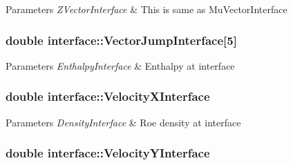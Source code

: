 \begin{DoxyParams}{Parameters}
{\em Z\+Vector\+Interface} & This is same as Mu\+Vector\+Interface \\
\hline
\end{DoxyParams}
\subsubsection[{\texorpdfstring{Vector\+Jump\+Interface}{VectorJumpInterface}}]{\setlength{\rightskip}{0pt plus 5cm}double interface\+::\+Vector\+Jump\+Interface\mbox{[}5\mbox{]}}\hypertarget{classinterface_aa99760e0d73f30c6f1541414efc76f87}{}\label{classinterface_aa99760e0d73f30c6f1541414efc76f87}

\begin{DoxyParams}{Parameters}
{\em Enthalpy\+Interface} & Enthalpy at interface \\
\hline
\end{DoxyParams}
\subsubsection[{\texorpdfstring{Velocity\+X\+Interface}{VelocityXInterface}}]{\setlength{\rightskip}{0pt plus 5cm}double interface\+::\+Velocity\+X\+Interface}\hypertarget{classinterface_afae6ebb7814474f2264759a14521f448}{}\label{classinterface_afae6ebb7814474f2264759a14521f448}

\begin{DoxyParams}{Parameters}
{\em Density\+Interface} & Roe density at interface \\
\hline
\end{DoxyParams}
\subsubsection[{\texorpdfstring{Velocity\+Y\+Interface}{VelocityYInterface}}]{\setlength{\rightskip}{0pt plus 5cm}double interface\+::\+Velocity\+Y\+Interface}\hypertarget{classinterface_a0f42e6e3fd259e9fc191a255a6650ef6}{}\label{classinterface_a0f42e6e3fd259e9fc191a255a6650ef6}

